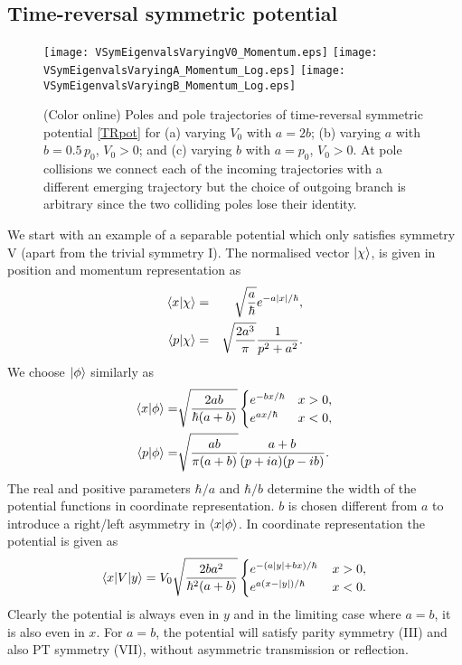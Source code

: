 \subsection{Time-reversal symmetric potential}
%
%
\begin{figure}[h]
    \texttt{[image: VSymEigenvalsVaryingV0\_Momentum.eps]}
    \texttt{[image: VSymEigenvalsVaryingA\_Momentum\_Log.eps]}
    \texttt{[image: VSymEigenvalsVaryingB\_Momentum\_Log.eps]}
    \caption{(Color online) Poles and pole trajectories of time-reversal symmetric potential \eqref{TRpot} for (a) varying $V_0$ with $a=2 b$; (b) varying $a$ with $b=0.5\, p_0$, $V_0>0$; and (c) varying $b$ with $a=p_0$,
    $V_0>0$. At pole collisions we connect each of the incoming trajectories with a different emerging trajectory but the choice of outgoing branch  is arbitrary since the two colliding poles lose their identity.}
    \label{fig:VSymEigenvals}
\end{figure}

We start with an example of a separable potential which only satisfies symmetry V (apart from the trivial symmetry I). The normalised vector $\ket{\chi}$, is given in position and momentum representation as
%
\begin{eqnarray}
\braket{x}{\chi}&=&\sqrt{\frac{a}{\hbar}} e^{-a \left| x \right|/\hbar},
\nonumber \\
\braket{p}{\chi}&=& \sqrt{\frac{2 a^3}{\pi}} \frac{1}{p^2+a^2}.
\end{eqnarray}
%
We choose $\ket{\phi}$ similarly as
%
\begin{eqnarray}
\braket{x}{\phi}=&\sqrt{\frac{2ab}{\hbar (a+b)}} \begin{cases}
 e^{-b x/\hbar} &x>0,\\ e^{a x/\hbar}  &x<0,
   \end{cases}\nonumber \\
\braket{p}{\phi}=& \sqrt{\frac{ab}{\pi (a+b)}}\frac{a+b}{(p+i a)(p-i b)}.
\end{eqnarray}
%
The real and positive parameters $\hbar/ a$ and $\hbar/ b$ determine the width of the potential functions in coordinate representation.
$b$ is chosen different from $a$ to introduce a right/left  asymmetry in $\braket{x}{\phi}$.
In coordinate representation the potential is given as
%
\begin{eqnarray}
\la x|V|y\ra = V_{0} \sqrt{\frac{2 b a^2}{\hbar^2 (a+b)}} \begin{cases}
 e^{-(a \left| y \right|+b x)/\hbar} \, &x>0,\\ e^{a (x-\left| y \right|)/\hbar} \,  &x<0.
   \end{cases} \label{TRpot}
\end{eqnarray}
%
Clearly the potential is always even in $y$ and in the limiting case where $a=b$, it is also even in $x$. For $a=b$, the potential will satisfy parity symmetry (III) and also PT symmetry (VII), without asymmetric transmission or reflection.

